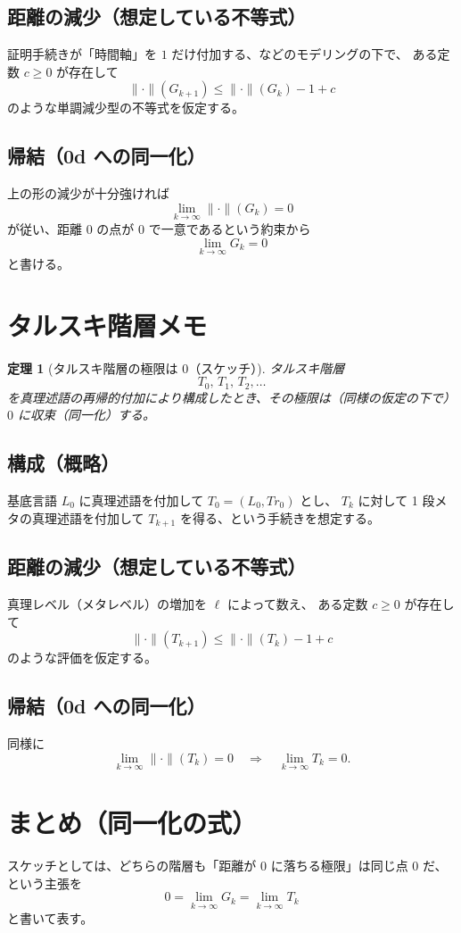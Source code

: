 \documentclass[12pt,a4paper]{article}
\newcommand{\dfix}{\mathfrak{0}} %
\newcommand{\dist}{\|\cdot\|}
\newtheorem{theorem}{定理}[section]
\begin{document}
\subsection*{距離の減少（想定している不等式）}
証明手続きが「時間軸」を $1$ だけ付加する、などのモデリングの下で、
ある定数 $c\ge0$ が存在して
\[
  \dist(G_{k+1})\le \dist(G_{k})-1+c
\]
のような単調減少型の不等式を仮定する。

\subsection*{帰結（0d への同一化）}
上の形の減少が十分強ければ
\[
  \lim_{k\to\infty}\dist(G_k)=0
\]
が従い、距離 $0$ の点が $\dfix$ で一意であるという約束から
\[
  \lim_{k\to\infty} G_k = \dfix
\]
と書ける。

\section{タルスキ階層メモ}
\begin{theorem}[タルスキ階層の極限は $\dfix$（スケッチ）]
タルスキ階層
\[
  T_{0},\,T_{1},\,T_{2},\dots
\]
を真理述語の再帰的付加により構成したとき、その極限は（同様の仮定の下で）$\dfix$ に収束（同一化）する。
\end{theorem}

\subsection*{構成（概略）}
基底言語 $L_0$ に真理述語を付加して $T_0=(L_0,Tr_0)$ とし、
$T_k$ に対して 1 段メタの真理述語を付加して $T_{k+1}$ を得る、という手続きを想定する。

\subsection*{距離の減少（想定している不等式）}
真理レベル（メタレベル）の増加を $\ell$ によって数え、
ある定数 $c\ge0$ が存在して
\[
  \dist(T_{k+1})\le \dist(T_k)-1+c
\]
のような評価を仮定する。

\subsection*{帰結（0d への同一化）}
同様に
\[
  \lim_{k\to\infty}\dist(T_k)=0
  \quad\Rightarrow\quad
  \lim_{k\to\infty} T_k = \dfix.
\]

\section{まとめ（同一化の式）}
スケッチとしては、どちらの階層も「距離が $0$ に落ちる極限」は同じ点 $\dfix$ だ、という主張を
\[
\dfix
= \lim_{k \to \infty} G_k
= \lim_{k \to \infty} T_k
\]
と書いて表す。
\end{document}

